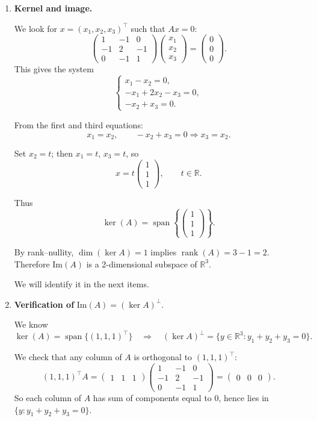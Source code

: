 \documentclass[11pt]{article}
\begin{document}
\begin{enumerate}
\item \textbf{Kernel and image.}

We look for $x=(x_1,x_2,x_3)^\top$ such that $Ax=0$:
\[
\begin{pmatrix}
1 & -1 & 0 \\
-1 & 2 & -1 \\
0 & -1 & 1
\end{pmatrix}
\begin{pmatrix}
x_1\\x_2\\x_3
\end{pmatrix}
=
\begin{pmatrix}
0\\0\\0
\end{pmatrix}.
\]
This gives the system
\[
\begin{cases}
x_1 - x_2 = 0,\\
- x_1 + 2x_2 - x_3 = 0,\\
- x_2 + x_3 = 0.
\end{cases}
\]

From the first and third equations:
\[
x_1 = x_2,\qquad -x_2 + x_3 = 0 \Rightarrow x_3 = x_2.
\]

Set $x_2 = t$; then $x_1 = t$, $x_3 = t$, so
\[
x = t\begin{pmatrix}1\\1\\1\end{pmatrix},\qquad t\in\mathbb{R}.
\]

Thus
\[
\ker(A) = \operatorname{span}\left\{\begin{pmatrix}1\\1\\1\end{pmatrix}\right\}.
\]

By rank–nullity, $\dim(\ker A)=1$ implies $\operatorname{rank}(A)=3-1=2$.  
Therefore $\mathrm{Im}(A)$ is a 2-dimensional subspace of $\mathbb{R}^3$.

We will identify it in the next items.

\item \textbf{Verification of} $\mathrm{Im}(A) = (\ker A)^\perp$.

We know
\[
\ker(A) = \operatorname{span}\{(1,1,1)^\top\}
\quad\Longrightarrow\quad
(\ker A)^\perp = \{y\in\mathbb{R}^3 : y_1 + y_2 + y_3 = 0\}.
\]

We check that any column of $A$ is orthogonal to $(1,1,1)^\top$:
\[
(1,1,1)^\top A
=
\begin{pmatrix}1 & 1 & 1\end{pmatrix}
\begin{pmatrix}
1 & -1 & 0 \\
-1 & 2 & -1 \\
0 & -1 & 1
\end{pmatrix}
=
\begin{pmatrix}
0 & 0 & 0
\end{pmatrix}.
\]
So each column of $A$ has sum of components equal to $0$, hence lies in
\(\{y : y_1+y_2+y_3=0\}\).  


\end{enumerate}
\end{document}
